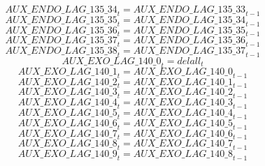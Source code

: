 \begin{dmath}
{AUX\_ENDO\_LAG\_135\_34}_{t}={AUX\_ENDO\_LAG\_135\_33}_{t-1}
\end{dmath}
\begin{dmath}
{AUX\_ENDO\_LAG\_135\_35}_{t}={AUX\_ENDO\_LAG\_135\_34}_{t-1}
\end{dmath}
\begin{dmath}
{AUX\_ENDO\_LAG\_135\_36}_{t}={AUX\_ENDO\_LAG\_135\_35}_{t-1}
\end{dmath}
\begin{dmath}
{AUX\_ENDO\_LAG\_135\_37}_{t}={AUX\_ENDO\_LAG\_135\_36}_{t-1}
\end{dmath}
\begin{dmath}
{AUX\_ENDO\_LAG\_135\_38}_{t}={AUX\_ENDO\_LAG\_135\_37}_{t-1}
\end{dmath}
\begin{dmath}
{AUX\_EXO\_LAG\_140\_0}_{t}={delall}_{t}
\end{dmath}
\begin{dmath}
{AUX\_EXO\_LAG\_140\_1}_{t}={AUX\_EXO\_LAG\_140\_0}_{t-1}
\end{dmath}
\begin{dmath}
{AUX\_EXO\_LAG\_140\_2}_{t}={AUX\_EXO\_LAG\_140\_1}_{t-1}
\end{dmath}
\begin{dmath}
{AUX\_EXO\_LAG\_140\_3}_{t}={AUX\_EXO\_LAG\_140\_2}_{t-1}
\end{dmath}
\begin{dmath}
{AUX\_EXO\_LAG\_140\_4}_{t}={AUX\_EXO\_LAG\_140\_3}_{t-1}
\end{dmath}
\begin{dmath}
{AUX\_EXO\_LAG\_140\_5}_{t}={AUX\_EXO\_LAG\_140\_4}_{t-1}
\end{dmath}
\begin{dmath}
{AUX\_EXO\_LAG\_140\_6}_{t}={AUX\_EXO\_LAG\_140\_5}_{t-1}
\end{dmath}
\begin{dmath}
{AUX\_EXO\_LAG\_140\_7}_{t}={AUX\_EXO\_LAG\_140\_6}_{t-1}
\end{dmath}
\begin{dmath}
{AUX\_EXO\_LAG\_140\_8}_{t}={AUX\_EXO\_LAG\_140\_7}_{t-1}
\end{dmath}
\begin{dmath}
{AUX\_EXO\_LAG\_140\_9}_{t}={AUX\_EXO\_LAG\_140\_8}_{t-1}
\end{dmath}
